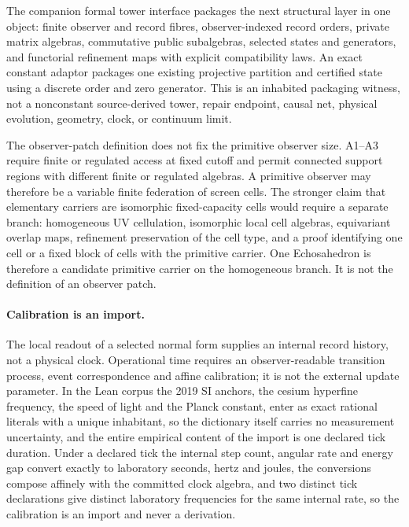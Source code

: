 \documentclass[11pt]{article}
\begin{document}
The companion formal tower interface packages the next structural layer in
one object: finite observer and record fibres, observer-indexed record orders,
private matrix algebras, commutative public subalgebras, selected states and
generators, and functorial refinement maps with explicit compatibility laws.
An exact constant adaptor packages one existing projective partition and
certified state using a discrete order and zero generator. This is an
inhabited packaging witness, not a nonconstant source-derived tower, repair
endpoint, causal net, physical evolution, geometry, clock, or continuum limit.

The observer-patch definition does not fix the primitive observer size. A1--A3 require finite or regulated
access at fixed cutoff and permit connected support regions with different finite or regulated
algebras. A primitive observer may therefore be a variable finite federation of screen cells. The
stronger claim that elementary carriers are isomorphic fixed-capacity cells would require a separate
branch: homogeneous UV cellulation, isomorphic local cell algebras, equivariant overlap maps,
refinement preservation of the cell type, and a proof identifying one cell or a fixed block of cells
with the primitive carrier.
One Echosahedron is therefore a candidate primitive carrier on the homogeneous branch. It is not the
definition of an observer patch.

\paragraph{Calibration is an import.}
The local readout of a selected normal form supplies an internal record
history, not a physical clock. Operational time requires an observer-readable
transition process, event correspondence and affine calibration; it is not
the external update parameter. In the Lean corpus the 2019 SI anchors, the
cesium hyperfine frequency, the speed of light and the Planck constant, enter
as exact rational literals with a unique inhabitant, so the dictionary itself
carries no measurement uncertainty, and the entire empirical content of the
import is one declared tick duration. Under a declared tick the internal step
count, angular rate and energy gap convert exactly to laboratory seconds,
hertz and joules, the conversions compose affinely with the committed clock
algebra, and two distinct tick declarations give distinct laboratory
frequencies for the same internal rate, so the calibration is an import and
never a derivation.
\end{document}
